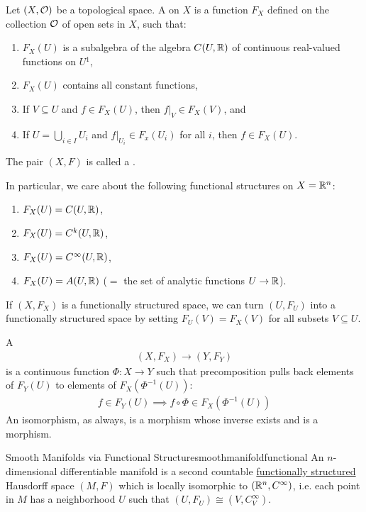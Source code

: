 \begin{importantdefinition}{}{}
	Let $(X, \mathcal{O})$ be a topological space. A  on $X$ is a function $F_X$ defined on the collection $\mathcal{O}$ of open sets in $X$, such that:
	\begin{enumerate}
		\item $F_X(U)$ is a subalgebra of the algebra $C(U, \mathbb{R})$ of continuous real-valued functions on $U$$^1$,
		\item $F_X(U)$ contains all constant functions,
		\item If $V \subseteq U$ and $f \in F_X(U)$, then $f|_V \in F_X(V)$, and
		\item If $U = \bigcup_{i \in I} U_i$ and $f|_{U_i} \in F_x(U_i)$ for all $i$, then $f \in F_X(U)$.
	\end{enumerate}
	The pair $(X, F)$ is called a .
\end{importantdefinition}
\noindent
In particular, we care about the following functional structures on $X = \mathbb{R}^n$:
\begin{enumerate}
	\item $F_X(U) = C(U, \mathbb{R})$,
	\item $F_X(U) = C^k(U, \mathbb{R})$,
	\item $F_X(U) = C^\infty(U, \mathbb{R})$,
	\item $F_X(U) = A(U, \mathbb{R})$ ($=$ the set of analytic functions $U \to \mathbb{R}$).
\end{enumerate}
\begin{exercise}
	If $(X, F_X)$ is a functionally structured space, we can turn $(U, F_U)$ into a functionally structured space by setting $F_U(V) = F_X(V)$ for all subsets $V \subseteq U$.
\end{exercise}
\begin{importantdefinition}{}{}
	A 
	\begin{align*}
		(X, F_X) \to (Y, F_Y)
	\end{align*}
	is a continuous function $\Phi : X \to Y$ such that precomposition pulls back elements of $F_Y(U)$ to elements of $F_X(\Phi^{-1}(U))$:
	\begin{align*}
		f \in F_Y(U) \implies f \circ \Phi \in F_X(\Phi^{-1}(U))
	\end{align*}
	An isomorphism, as always, is a morphism whose inverse exists and is a morphism.
\end{importantdefinition}
\begin{importantdefinition}{Smooth Manifolds via Functional Structure}{smoothmanifoldfunctional}
	An $n$-dimensional differentiable manifold is a second countable \ul{functionally structured} Hausdorff space $(M, F)$ which is locally isomorphic to $(\mathbb{R}^n, C^\infty)$, i.e. each point in $M$ has a neighborhood $U$ such that $(U, F_U) \cong (V, C^\infty_V)$.
\end{importantdefinition}
